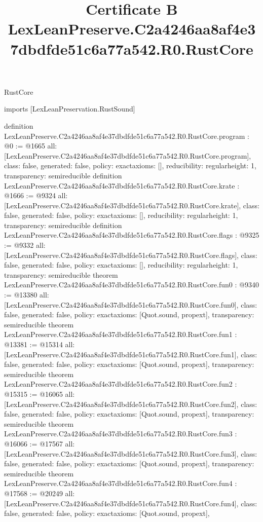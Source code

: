 \begin{lexlean}{RustCore}
\title{Certificate B LexLeanPreserve.C2a4246aa8af4e37dbdfde51c6a77a542.R0.RustCore}
\begin{coremodule}
imports [LexLeanPreservation.RustSound]

definition LexLeanPreserve.C2a4246aa8af4e37dbdfde51c6a77a542.R0.RustCore.program : @0 := @1665 {
  all: [LexLeanPreserve.C2a4246aa8af4e37dbdfde51c6a77a542.R0.RustCore.program],
  class: false,
  generated: false,
  policy: exact{axioms: []},
  reducibility: regular{height: 1},
  transparency: semireducible
}
definition LexLeanPreserve.C2a4246aa8af4e37dbdfde51c6a77a542.R0.RustCore.krate : @1666 := @9324 {
  all: [LexLeanPreserve.C2a4246aa8af4e37dbdfde51c6a77a542.R0.RustCore.krate],
  class: false,
  generated: false,
  policy: exact{axioms: []},
  reducibility: regular{height: 1},
  transparency: semireducible
}
definition LexLeanPreserve.C2a4246aa8af4e37dbdfde51c6a77a542.R0.RustCore.flags : @9325 := @9332 {
  all: [LexLeanPreserve.C2a4246aa8af4e37dbdfde51c6a77a542.R0.RustCore.flags],
  class: false,
  generated: false,
  policy: exact{axioms: []},
  reducibility: regular{height: 1},
  transparency: semireducible
}
theorem LexLeanPreserve.C2a4246aa8af4e37dbdfde51c6a77a542.R0.RustCore.fun0 : @9340 := @13380 {
  all: [LexLeanPreserve.C2a4246aa8af4e37dbdfde51c6a77a542.R0.RustCore.fun0],
  class: false,
  generated: false,
  policy: exact{axioms: [Quot.sound, propext]},
  transparency: semireducible
}
theorem LexLeanPreserve.C2a4246aa8af4e37dbdfde51c6a77a542.R0.RustCore.fun1 : @13381 := @15314 {
  all: [LexLeanPreserve.C2a4246aa8af4e37dbdfde51c6a77a542.R0.RustCore.fun1],
  class: false,
  generated: false,
  policy: exact{axioms: [Quot.sound, propext]},
  transparency: semireducible
}
theorem LexLeanPreserve.C2a4246aa8af4e37dbdfde51c6a77a542.R0.RustCore.fun2 : @15315 := @16065 {
  all: [LexLeanPreserve.C2a4246aa8af4e37dbdfde51c6a77a542.R0.RustCore.fun2],
  class: false,
  generated: false,
  policy: exact{axioms: [Quot.sound, propext]},
  transparency: semireducible
}
theorem LexLeanPreserve.C2a4246aa8af4e37dbdfde51c6a77a542.R0.RustCore.fun3 : @16066 := @17567 {
  all: [LexLeanPreserve.C2a4246aa8af4e37dbdfde51c6a77a542.R0.RustCore.fun3],
  class: false,
  generated: false,
  policy: exact{axioms: [Quot.sound, propext]},
  transparency: semireducible
}
theorem LexLeanPreserve.C2a4246aa8af4e37dbdfde51c6a77a542.R0.RustCore.fun4 : @17568 := @20249 {
  all: [LexLeanPreserve.C2a4246aa8af4e37dbdfde51c6a77a542.R0.RustCore.fun4],
  class: false,
  generated: false,
  policy: exact{axioms: [Quot.sound, propext]},
}
\end{coremodule}
\end{lexlean}

